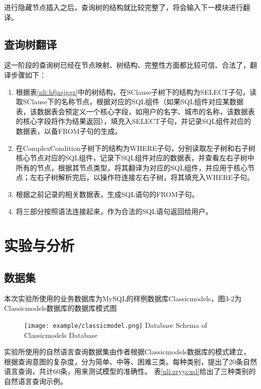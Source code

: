 进行隐藏节点插入之后，查询树的结构就比较完整了，将会输入下一模块进行翻译。

\subsection{查询树翻译}
\label{nli:cxsfy}
这一阶段的查询树已经在节点映射、树结构、完整性方面都比较可信、合法了，翻译步骤如下：
\begin{enumerate}
    \item 根据表\ref{nli:hfjxsjggz}中的树结构，在SClause子树下的结构为SELECT子句，读取SClause下的名称节点，根据对应的SQL组件（如果SQL组件对应某数据表，该数据表会预定义一个核心字段，如用户的名字、城市的名称，该数据表的核心字段将作为结果返回），填充入SELECT子句，并记录SQL组件对应的数据表，以备FROM子句的生成。
    \item 在ComplexCondition子树下的结构为WHERE子句，分别读取左子树和右子树核心节点对应的SQL组件，记录下SQL组件对应的数据表，并查看左右子树中所有的节点，根据其节点类型，将其翻译为对应的SQL组件，并应用于核心节点；左右子树解析完后，以操作符连接左右子树，将其填充入WHERE子句。
    \item 根据之前记录的相关数据表，生成SQL语句的FROM子句。
    \item 将三部分按照语法连接起来，作为合法的SQL语句返回给用户。
\end{enumerate}

\section{实验与分析}

\subsection{数据集}
本次实验所使用的业务数据库为MySQL的样例数据库Classicmodels，图3-2为Classicmodels数据库的数据库模式图
\begin{figure}[!htp]
    \centering
    \texttt{[image: example/classicmodel.png]}
      {Database Schema of Classicmodels Database}
    \label{fig:NLIclassicmodel}
  \end{figure}

实验所使用的自然语言查询数据集由作者根据Classicmodels数据库的模式建立，根据查询意图的复杂度，分为简单、中等、困难三类。每种类别，提出了20条自然语言查询，共计60条，用来测试模型的准确性。
表\ref{nli:zryycxsl}给出了三种类别的自然语言查询示例。

